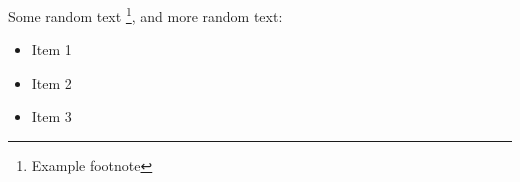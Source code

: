 \documentclass[twoside]{article}
\begin{document}
Some random text \footnote{Example footnote}, and more random text:

\begin{itemize}
\item Item 1 %
\item Item 2
\item Item 3
\end{itemize}




%
%
%


% 


\end{document}
